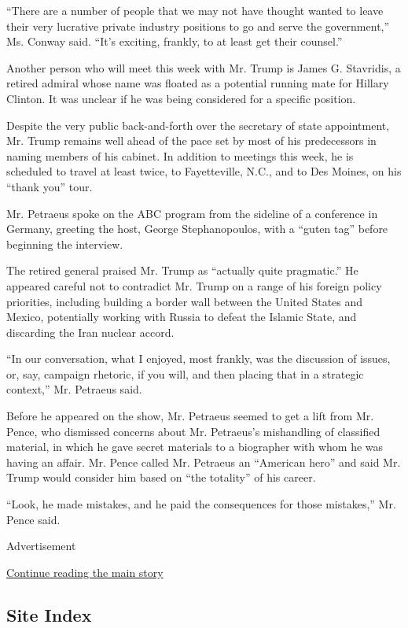 ``There are a number of people that we may not have thought wanted to
leave their very lucrative private industry positions to go and serve
the government,'' Ms. Conway said. ``It's exciting, frankly, to at least
get their counsel.''

Another person who will meet this week with Mr. Trump is James G.
Stavridis, a retired admiral whose name was floated as a potential
running mate for Hillary Clinton. It was unclear if he was being
considered for a specific position.

Despite the very public back-and-forth over the secretary of state
appointment, Mr. Trump remains well ahead of the pace set by most of his
predecessors in naming members of his cabinet. In addition to meetings
this week, he is scheduled to travel at least twice, to Fayetteville,
N.C., and to Des Moines, on his ``thank you'' tour.

Mr. Petraeus spoke on the ABC program from the sideline of a conference
in Germany, greeting the host, George Stephanopoulos, with a ``guten
tag'' before beginning the interview.

The retired general praised Mr. Trump as ``actually quite pragmatic.''
He appeared careful not to contradict Mr. Trump on a range of his
foreign policy priorities, including building a border wall between the
United States and Mexico, potentially working with Russia to defeat the
Islamic State, and discarding the Iran nuclear accord.

``In our conversation, what I enjoyed, most frankly, was the discussion
of issues, or, say, campaign rhetoric, if you will, and then placing
that in a strategic context,'' Mr. Petraeus said.

Before he appeared on the show, Mr. Petraeus seemed to get a lift from
Mr. Pence, who dismissed concerns about Mr. Petraeus's mishandling of
classified material, in which he gave secret materials to a biographer
with whom he was having an affair. Mr. Pence called Mr. Petraeus an
``American hero'' and said Mr. Trump would consider him based on ``the
totality'' of his career.

``Look, he made mistakes, and he paid the consequences for those
mistakes,'' Mr. Pence said.

Advertisement

\protect\hyperlink{after-bottom}{Continue reading the main story}

\hypertarget{site-index}{%
\subsection{Site Index}\label{site-index}}


